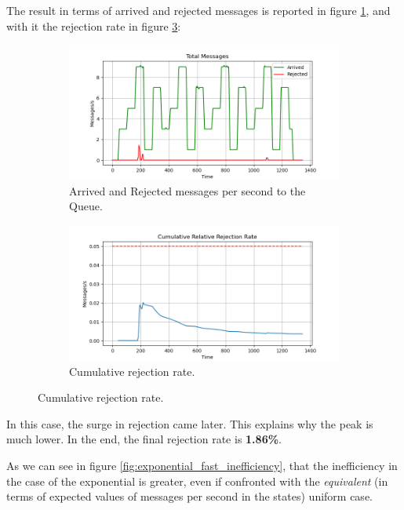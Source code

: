 The result in terms of arrived and rejected messages is reported in figure \ref{fig:exponential_fast_messages}, and with it the rejection rate in figure \ref{fig:exponential_fast_rejection}:

\begin{figure}[H]
    \centering
    \begin{subfigure}{0.85\linewidth}
        \includegraphics[width=\linewidth]{images/sliding_window/constant/messages.png}
        \caption{Arrived and Rejected messages per second to the Queue.}
        \label{fig:exponential_fast_messages}
    \end{subfigure}
    \begin{subfigure}{0.85\linewidth}
        \includegraphics[width=\linewidth]{images/sliding_window/constant/rejection_cumulative.png}
        \caption{Cumulative rejection rate.}
        \label{fig:exponential_fast_rejection}
    \end{subfigure}
\end{figure}
In this case, the surge in rejection came later. This explains why the peak is much lower. In the end, the final rejection rate is \textbf{1.86\%}.

As we can see in figure \ref{fig:exponential_fast_inefficiency}, that the inefficiency in the case of the exponential is greater, even if confronted with the \textit{equivalent} (in terms of expected values of messages per second in the states) uniform case. 


